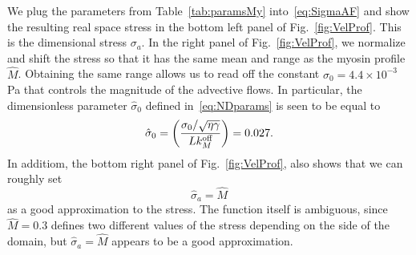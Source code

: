 \documentclass[11pt]{article}
\newcommand{\6}[1]{#1_{\text{6}}}
\newcommand{\3}[1]{#1_{\text{3}}}
\newcommand{\My}[1]{#1_M}
\begin{document}
We plug the parameters from Table\ \ref{tab:paramsMy} into\ \eqref{eq:SigmaAF} and show the resulting real space stress in the bottom left panel of Fig.\ \ref{fig:VelProf}. This is the dimensional stress $\sigma_a$. In the right panel of Fig.\ \ref{fig:VelProf}, we normalize and shift the stress so that it has the same mean and range as the myosin profile $\hat M$. Obtaining the same range allows us to read off the constant $\sigma_0=4.4 \times 10^{-3}$ Pa that controls the magnitude of the advective flows. In particular, the dimensionless parameter $\hat{\sigma}_0$ defined in\ \eqref{eq:NDparams} is seen to be equal to
\begin{equation}
\hat{\sigma}_0 = \left(\frac{\sigma_0/ \sqrt{\eta \gamma} }{L \My{\koff}}\right)  = 0.027.
\end{equation}
In additiom, the bottom right panel of Fig.\ \ref{fig:VelProf}, also shows that we can roughly set
\begin{equation}
\hat \sigma_a=\hat M
\end{equation}
as a good approximation to the stress. The function itself is ambiguous, since $\hat M=0.3$ defines two different values of the stress depending on the side of the domain, but $\hat \sigma_a=\hat M$ appears to be a good approximation.

\end{document}
